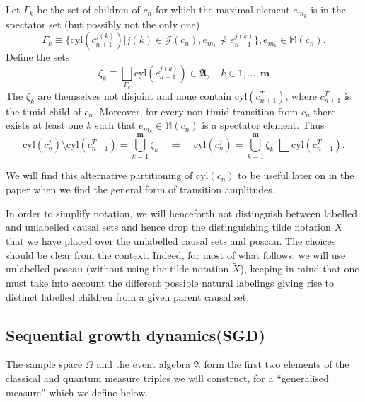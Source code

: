 \documentclass[11pt]{article}
\newcommand{\cyl}[1]{{\mathrm{cyl}({#1})}}
\newcommand{\fA}{\mathfrak A}
\newcommand{\cJ}{\mathcal J}
\newcommand{\setzeta}{\Gamma}
\newcommand{\mm}{\mathbb{M}}
\newcommand{\bmm}{{\mathbf m}}
\begin{document}
Let $\setzeta_k$ be the set of
children of $c_n$ for which the 
maximal element $e_{m_k}$ is in the spectator set  (but possibly not the only
one) 
\begin{equation} 
\setzeta_k \equiv \{\cyl{c_{n+1}^{j(k)}} | j(k) \in \cJ(c_n), e_{m_k}
\nprec e^{j(k)}_{n+1} \},  e_{m_k} \in \mm(c_n). 
\end{equation}
Define the sets 
\begin{equation}
\zeta_k \equiv \bigsqcup_{\setzeta_k} \cyl{c_{n+1}^{j(k)}} \in \fA,
\quad k \in {1, \ldots,  \bmm} 
\end{equation}  
The  $\zeta_k$ are themselves not disjoint and none contain
$\cyl{c_{n+1}^T}$, where $c_{n+1}^T$ is the timid child of $c_n$.
 Moreover, for every  non-timid
transition from $c_n$ there exists at least one $k$ such that $e_{m_k}
\in \mm(c_n)$ is a spectator element. Thus  
\begin{equation}
  \cyl{c_n^j}\setminus\cyl{c_{n+1}^T} = \bigcup_{k=1}^{\bmm}
    \zeta_k \quad \Rightarrow \quad 
  \cyl{c_n^j} = \bigcup_{k=1}^{\bmm} \zeta_k \, \, \bigsqcup
  \cyl{c_{n+1}^T}. \label{zetal.eq} 
\end{equation}


We will find this alternative partitioning of $\cyl{c_n}$ to be
useful later on in the paper when we  find the general form of
transition amplitudes.  




 In order to simplify notation, we will
henceforth 
not distinguish between labelled and unlabelled causal sets and hence
drop the distinguishing tilde notation $\tilde{X}$ that we have placed over the
unlabelled causal sets and poscau.   The choices 
should be clear from the context. Indeed, for most
of what follows, we will use unlabelled poscau (without using the tilde
notation  $\tilde{X}$), keeping in mind that
one must take into account the 
different possible natural labelings giving rise to distinct labelled
children from a given parent causal set. 

\subsection{Sequential growth dynamics(SGD)}
\label{sgd.ssec} 


The sample space $\Omega$ and the event algebra $\fA$ form the first
two elements of the classical and quantum measure triples we will
construct, for a ``generalised measure'' which we define below. 
\end{document}
